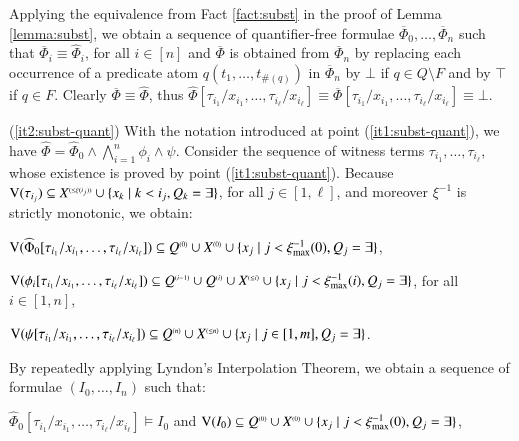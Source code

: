 {  Applying the equivalence from Fact \ref{fact:subst} in the proof of
  Lemma \ref{lemma:subst}, we obtain a sequence of quantifier-free
  formulae $\overline{\Phi}_0, \ldots, \overline{\Phi}_n$ such that
  $\overline{\Phi}_i \equiv \widehat{\Phi}_i$, for all $i \in [n]$ and
  $\overline{\Phi}$ is obtained from $\overline{\Phi}_n$ by replacing
  each occurrence of a predicate atom $q(t_1,\ldots,t_{\#(q)})$ in
  $\overline{\Phi}_n$ by $\bot$ if $q \in Q\setminus F$ and by $\top$
  if $q \in F$. Clearly $\overline{\Phi} \equiv \widehat{\Phi}$, thus
  $\widehat{\Phi}[\tau_{i_1}/x_{i_1}, \ldots,
    \tau_{i_\ell}/x_{i_\ell}] \equiv
  \overline{\Phi}[\tau_{i_1}/x_{i_1}, \ldots,
    \tau_{i_\ell}/x_{i_\ell}] \equiv \bot$.

  \noindent(\ref{it2:subst-quant}) With the notation introduced at
  point (\ref{it1:subst-quant}), we have $\widehat{\Phi} =
  \widehat{\Phi}_0 \wedge \bigwedge_{i=1}^n \phi_i \wedge
  \psi$. Consider the sequence of witness terms $\tau_{i_1}, \ldots,
  \tau_{i_\ell}$, whose existence is proved by point
  (\ref{it1:subst-quant}). Because $\mathrm{V}({\tau_{i_j}}) \subseteq
  {X}^{\scriptscriptstyle{({\leq \xi(i_j)})}} \cup \{ x_k \mid k < i_j, Q_k =
    \exists \}$, for all $j \in [1,\ell]$, and moreover $\xi^{-1}$ is
  strictly monotonic, we obtain: \begin{compactitem}
  \item $\mathrm{V}({\widehat{\Phi}_0[\tau_{i_1}/x_{i_1}, \ldots,
      \tau_{i_\ell}/x_{i_\ell}]}) \subseteq {Q}^{\scriptscriptstyle{({0})}} \cup
    {X}^{\scriptscriptstyle{({0})}} \cup \{ x_j \mid j < \xi_{\max}^{-1}(0), Q_j = \exists \}$,
  \item $\mathrm{V}({\phi_i[\tau_{i_1}/x_{i_1}, \ldots,
      \tau_{i_\ell}/x_{i_\ell}]}) \subseteq {Q}^{\scriptscriptstyle{({i-1})}} \cup
    {Q}^{\scriptscriptstyle{({i})}} \cup {X}^{\scriptscriptstyle{({\leq i})}} \cup \{ x_j \mid j <
      \xi_{\max}^{-1}(i), Q_j = \exists \}$, for all $i \in [1,n]$,
  \item $\mathrm{V}({\psi[\tau_{i_1}/x_{i_1}, \ldots,
      \tau_{i_\ell}/x_{i_\ell}]}) \subseteq {Q}^{\scriptscriptstyle{({n})}} \cup
    {X}^{\scriptscriptstyle{({\leq n})}} \cup \{ x_j \mid j \in [1,m], Q_j = \exists \}$.
  \end{compactitem}
  By repeatedly applying Lyndon's Interpolation Theorem, we obtain a
  sequence of formulae $(I_0, \ldots, I_n)$ such that: \begin{compactitem}
    \item $\widehat{\Phi}_0[\tau_{i_1}/x_{i_1}, \ldots,
      \tau_{i_\ell}/x_{i_\ell}] \models I_0$ and $\mathrm{V}({I_0}) \subseteq
      {Q}^{\scriptscriptstyle{({0})}} \cup {X}^{\scriptscriptstyle{({0})}} \cup \{ x_j \mid j <
        \xi_{\max}^{-1}(0), Q_j = \exists \}$,

\end{compactitem}}

